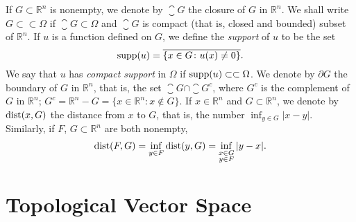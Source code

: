 \begin{para}
  If $G\subset\mathbb{R}^n$ is nonempty, we denote by $\closure{G}$ the closure
  of $G$ in $\mathbb{R}^n$. We shall write $G\subset\subset\Omega$
  if $\closure{G}\subset\Omega$ and $\closure{G}$ is compact
  (that is, closed and bounded) subset of $\mathbb{R}^n$.
  If $u$ is a function defined on $G$, we define the \emph{support}
  of $u$ to be the set
  \[\operatorname{supp}(u) = \overline{\{x\in G\colon u(x)\neq 0\}}.\]
  We say that $u$ has \emph{compact support} in $\Omega$ if $\operatorname{supp}(u)\subset\subset\Omega$.
  We denote by $\partial G$ the boundary of $G$ in $\mathbb{R}^n$, that is,
  the set $\closure{G}\cap\closure{G^c}$, where $G^c$ is the complement 
  of $G$ in $\mathbb{R}^n$; $G^c = \mathbb{R}^n-G = \{x\in\mathbb{R}^n\colon x\notin G\}$.
  If $x\in\mathbb{R}^n$ and $G\subset\mathbb{R}^n$, we denote by $\operatorname{dist}(x,G)$
  the distance from $x$ to $G$, that is, the number $\inf_{y\in G} |x-y|$.
  Similarly, if $F$, $G\subset\mathbb{R}^n$ are both nonempty,
  \[\operatorname{dist}(F, G) = \inf_{y\in F} \operatorname{dist}(y,G)
    =\inf_{\substack{x\in G \\ y\in F}} |y-x|.\] 
\end{para}


\section{Topological Vector Space}

